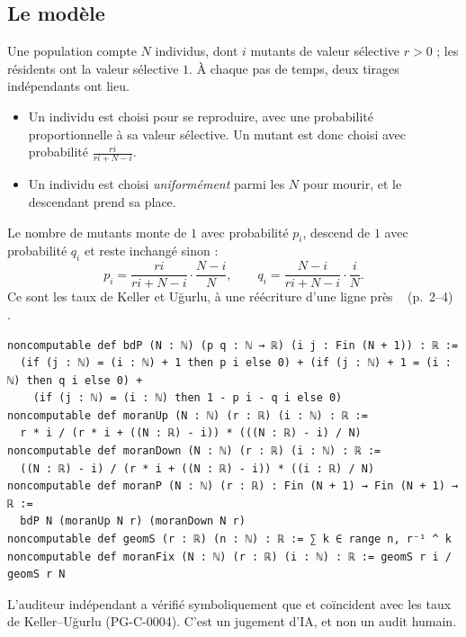 \subsection{Le modèle}
Une population compte $N$ individus, dont $i$ mutants de valeur sélective $r>0$ ; les résidents ont la valeur
sélective $1$. À chaque pas de temps, deux tirages indépendants ont lieu.
\begin{itemize}[itemsep=1pt]
\item Un individu est choisi pour se reproduire, avec une probabilité proportionnelle à sa valeur sélective. Un
mutant est donc choisi avec probabilité $\frac{ri}{ri+N-i}$.
\item Un individu est choisi \emph{uniformément} parmi les $N$ pour mourir, et le descendant prend sa place.
\end{itemize}
Le nombre de mutants monte de $1$ avec probabilité $p_i$, descend de $1$ avec probabilité $q_i$ et reste
inchangé sinon :
\[
p_i=\frac{ri}{ri+N-i}\cdot\frac{N-i}{N},\qquad q_i=\frac{N-i}{ri+N-i}\cdot\frac iN .
\]
Ce sont les taux de Keller et Uğurlu, à une réécriture d'une ligne près \tierL{}~\cite{ch4:KU} (p.~2--4) \tierC.

\begin{leanbox}
\begin{lstlisting}[language=Lean]
noncomputable def bdP (N : ℕ) (p q : ℕ → ℝ) (i j : Fin (N + 1)) : ℝ :=
  (if (j : ℕ) = (i : ℕ) + 1 then p i else 0) + (if (j : ℕ) + 1 = (i : ℕ) then q i else 0) +
    (if (j : ℕ) = (i : ℕ) then 1 - p i - q i else 0)
noncomputable def moranUp (N : ℕ) (r : ℝ) (i : ℕ) : ℝ :=
  r * i / (r * i + ((N : ℝ) - i)) * (((N : ℝ) - i) / N)
noncomputable def moranDown (N : ℕ) (r : ℝ) (i : ℕ) : ℝ :=
  ((N : ℝ) - i) / (r * i + ((N : ℝ) - i)) * ((i : ℝ) / N)
noncomputable def moranP (N : ℕ) (r : ℝ) : Fin (N + 1) → Fin (N + 1) → ℝ :=
  bdP N (moranUp N r) (moranDown N r)
noncomputable def geomS (r : ℝ) (n : ℕ) : ℝ := ∑ k ∈ range n, r⁻¹ ^ k
noncomputable def moranFix (N : ℕ) (r : ℝ) (i : ℕ) : ℝ := geomS r i / geomS r N
\end{lstlisting}
L'auditeur indépendant a vérifié symboliquement que  et  coïncident avec les taux
de Keller--Uğurlu (PG-C-0004). C'est un jugement d'IA, et non un audit humain.
\end{leanbox}

